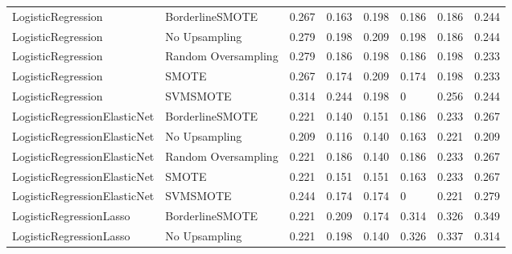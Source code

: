 \begin{tabular}{llllllll}
          LogisticRegression &     BorderlineSMOTE & 0.267 &                     0.163 &                 0.198 &                  0.186 &                                   0.186 &     0.244 \\
          LogisticRegression &       No Upsampling & 0.279 &                     0.198 &                 0.209 &                  0.198 &                                   0.186 &     0.244 \\
          LogisticRegression & Random Oversampling & 0.279 &                     0.186 &                 0.198 &                  0.186 &                                   0.198 &     0.233 \\
          LogisticRegression &               SMOTE & 0.267 &                     0.174 &                 0.209 &                  0.174 &                                   0.198 &     0.233 \\
          LogisticRegression &            SVMSMOTE & 0.314 &                     0.244 &                 0.198 &                      0 &                                   0.256 &     0.244 \\
LogisticRegressionElasticNet &     BorderlineSMOTE & 0.221 &                     0.140 &                 0.151 &                  0.186 &                                   0.233 &     0.267 \\
LogisticRegressionElasticNet &       No Upsampling & 0.209 &                     0.116 &                 0.140 &                  0.163 &                                   0.221 &     0.209 \\
LogisticRegressionElasticNet & Random Oversampling & 0.221 &                     0.186 &                 0.140 &                  0.186 &                                   0.233 &     0.267 \\
LogisticRegressionElasticNet &               SMOTE & 0.221 &                     0.151 &                 0.151 &                  0.163 &                                   0.233 &     0.267 \\
LogisticRegressionElasticNet &            SVMSMOTE & 0.244 &                     0.174 &                 0.174 &                      0 &                                   0.221 &     0.279 \\
     LogisticRegressionLasso &     BorderlineSMOTE & 0.221 &                     0.209 &                 0.174 &                  0.314 &                                   0.326 &     0.349 \\
     LogisticRegressionLasso &       No Upsampling & 0.221 &                     0.198 &                 0.140 &                  0.326 &                                   0.337 &     0.314 \\

\end{tabular}
